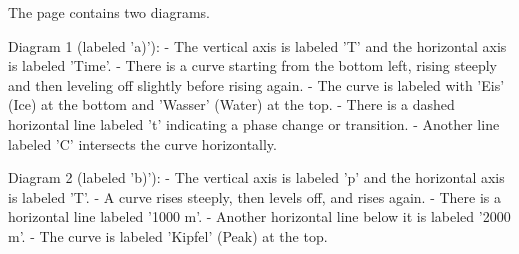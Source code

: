 The page contains two diagrams.

Diagram 1 (labeled 'a)'):
- The vertical axis is labeled 'T' and the horizontal axis is labeled 'Time'.
- There is a curve starting from the bottom left, rising steeply and then leveling off slightly before rising again.
- The curve is labeled with 'Eis' (Ice) at the bottom and 'Wasser' (Water) at the top.
- There is a dashed horizontal line labeled 't' indicating a phase change or transition.
- Another line labeled 'C' intersects the curve horizontally.

Diagram 2 (labeled 'b)'):
- The vertical axis is labeled 'p' and the horizontal axis is labeled 'T'.
- A curve rises steeply, then levels off, and rises again.
- There is a horizontal line labeled '1000 m'.
- Another horizontal line below it is labeled '2000 m'.
- The curve is labeled 'Kipfel' (Peak) at the top.